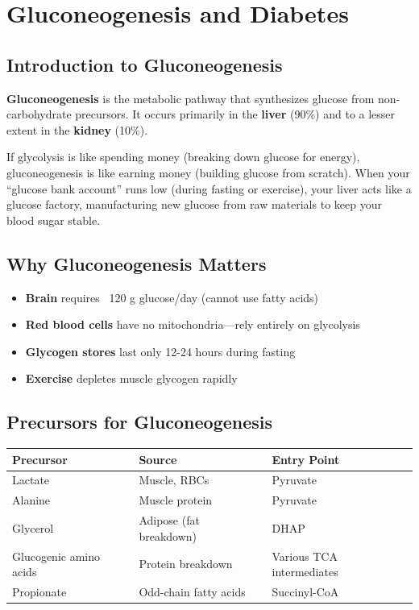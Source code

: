 \section{Gluconeogenesis and Diabetes}

\subsection{Introduction to Gluconeogenesis}

\begin{definition}
\textbf{Gluconeogenesis} is the metabolic pathway that synthesizes glucose from non-carbohydrate precursors. It occurs primarily in the \textbf{liver} (90\%) and to a lesser extent in the \textbf{kidney} (10\%).
\end{definition}

\begin{analogy}
If glycolysis is like spending money (breaking down glucose for energy), gluconeogenesis is like earning money (building glucose from scratch). When your ``glucose bank account'' runs low (during fasting or exercise), your liver acts like a glucose factory, manufacturing new glucose from raw materials to keep your blood sugar stable.
\end{analogy}

\subsection{Why Gluconeogenesis Matters}

\begin{itemize}
    \item \textbf{Brain} requires ~120 g glucose/day (cannot use fatty acids)
    \item \textbf{Red blood cells} have no mitochondria—rely entirely on glycolysis
    \item \textbf{Glycogen stores} last only 12-24 hours during fasting
    \item \textbf{Exercise} depletes muscle glycogen rapidly
\end{itemize}

\subsection{Precursors for Gluconeogenesis}

\begin{center}
\begin{tabular}{lll}
\toprule
\textbf{Precursor} & \textbf{Source} & \textbf{Entry Point} \\
\midrule
Lactate & Muscle, RBCs & Pyruvate \\
Alanine & Muscle protein & Pyruvate \\
Glycerol & Adipose (fat breakdown) & DHAP \\
Glucogenic amino acids & Protein breakdown & Various TCA intermediates \\
Propionate & Odd-chain fatty acids & Succinyl-CoA \\
\bottomrule
\end{tabular}
\end{center}

